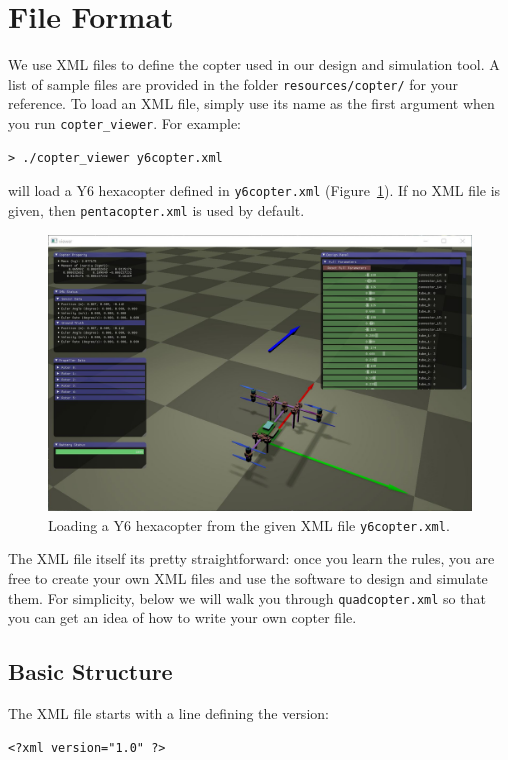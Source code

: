\clearpage
\section{File Format}\label{sec:file}
We use XML files to define the copter used in our design and simulation tool. A list of sample files are provided in the folder \texttt{resources/copter/} for your reference. To load an XML file, simply use its name as the first argument when you run \texttt{copter\_viewer}. For example:
\begin{verbatim}
> ./copter_viewer y6copter.xml
\end{verbatim}
will load a Y6 hexacopter defined in \texttt{y6copter.xml} (Figure~\ref{fig:y6_ui}). If no XML file is given, then \texttt{pentacopter.xml} is used by default.
\begin{figure}[htb]
	\centering
	\includegraphics[width=1.0\linewidth]{y6_ui}
	\caption{Loading a Y6 hexacopter from the given XML file \texttt{y6copter.xml}.}
	\label{fig:y6_ui}
\end{figure}

The XML file itself its pretty straightforward: once you learn the rules, you are free to create your own XML files and use the software to design and simulate them. For simplicity, below we will walk you through \texttt{quadcopter.xml} so that you can get an idea of how to write your own copter file.

\subsection{Basic Structure}
The XML file starts with a line defining the version:
\begin{verbatim}
<?xml version="1.0" ?>
\end{verbatim}

